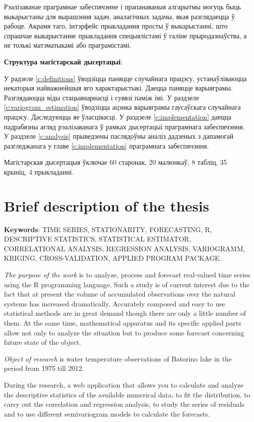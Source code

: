 Рэалізаванае праграмнае забеспячэнне і прапанаваныя алгарытмы могуць быць выкарыстаны для вырашэння задач, аналагічных задачы, якая разглядаецца ў рабоце. Акрамя таго, інтэрфейс прыкладання просты ў выкарыстанні, што спрашчае выкарыстанне прыкладання спецыялістамі ў галіне прыродазнаўства, а не толькі матэматыкамі або праграмістамі.

\textbf{Структура магістарскай дысертацыі}:

У радзеле \ref{c:definitions} ўводзіцца паняцце случайнага працэсу, устанаўліваюцца некаторыя найважнейшыя яго характарыстыкі. Даецца паняцце варыяграмы. Разглядаюцца віды стацыянарнасці і сувязі паміж імі. У раздзеле \ref {c:variogram_estimation} ўводзіцца ацэнка варыяграмы гаусаўскага случайнага працэсу. Даследуюцца яе ўласцівасці. У раздзеле \ref{c:implementation} даецца падрабязны агляд рэалізаванага ў рамках дысертацыі праграмнага забеспячэння. У раздзеле \ref{c:analysis} прыведзены паслядоўны аналіз дадзеных з дапамогай разгледжанага у главе \ref{c:implementation} праграмнага забеспячэння.

Магістарская дысертацыя ўключае 60 старонак, 20 малюнкаў, 8 табліц, 35 крыніц, 4 прыкладанні.

\newpage

\chapter*{Brief description of the thesis}

\textbf{Keywords}: TIME SERIES, STATIONARITY, FORECASTING, R, DESCRIPTIVE STATISTICS, STATISTICAL ESTIMATOR, CORRELATIONAL ANALYSIS, REGRESSION ANALYSIS, VARIOGRAMM, KRIGING, CROSS-VALIDATION, APPLIED PROGRAM PACKAGE\@.

\textit{The purpose of the work} is to analyze, process and forecast real-valued time series using the R programming language. Such a study is of current interest due to the fact that at present the volume of accumulated observations over the natural systems has increased dramatically. Accurately composed and easy to use statistical methods are in great demand though there are only a little number of them. At the same time, mathematical apparatus and its specific applied parts allow not only to analyze the situation but to produce some forecast concerning future state of the object.

\textit{Object of research} is water temperature observations of Batorino lake in the period from 1975 till 2012.

During the research, a web application that allows you to calculate and analyze the descriptive statistics of the available numerical data, to fit the distribution, to carry out the correlation and regression analysis, to study the series of residuals and to use different semivariogram models to calculate the forecasts.

